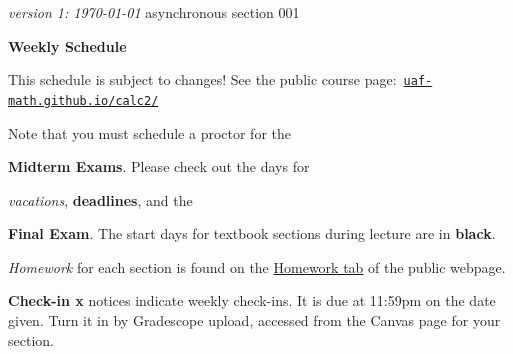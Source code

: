 \documentclass[12pt]{article}
\newcommand{\vacinline}[1]{{\color{OliveGreen} \textsl{#1}}}
\newcommand{\vac}[1]{\strut {\small {\vacinline{#1}}}}
\newcommand{\due}[1]{\strut {\color{BrickRed} \textsl{#1}}}
\newcommand{\dl}[1]{{\small \color{Purple} \textbf{#1}}}
\newcommand{\ee}[1]{\strut {\color{Blue} \textbf{#1}}}
\newcommand{\ckin}[1]{\strut {\color{Violet} \textbf{Check-in #1}}}
\begin{document}
\noindent\footnotesize \emph{version 1: \today} \normalsize \hfill asynchronous section 001

\bigskip
\centerline{\Large \textbf{Weekly Schedule}}

\bigskip
This schedule is subject to changes!  See the public course page: \,{\small \href{https://uaf-math.github.io/calc2/}{\texttt{uaf-math.github.io/calc2/}}}

\noindent Note that you must schedule a proctor for the \ee{Midterm Exams}.   Please check out the days for \vac{vacations}, \dl{deadlines}, and the \ee{Final Exam}.  The start days for textbook sections during lecture are in \textbf{black}.  \due{Homework} for each section is found on the \href{https://uaf-math251.github.io/calc2/}{Homework tab} of the public webpage. \ckin{x} notices indicate weekly check-ins. It is due at 11:59pm on the date given.  Turn it in by Gradescope upload, accessed from the Canvas page for your section.

\bigskip
\end{document}
